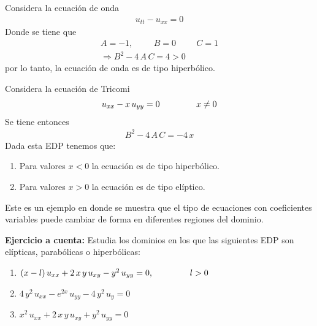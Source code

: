 \begin{ejemplo}
Considera la ecuación de onda
\begin{align*}
u_{tt} - u_{xx} = 0
\end{align*}
Donde se tiene que
\begin{align*}
A = -1, \hspace{1cm} B = 0 \hspace{1cm} C = 1 \\
\Rightarrow B^{2} - 4 \, A \, C = 4 > 0
\end{align*}
por lo tanto, la ecuación de onda es de tipo hiperbólico.
\end{ejemplo}
\begin{ejemplo}
Considera la ecuación de Tricomi
\begin{align*}
u_{xx} - x \, u_{yy} = 0 \hspace{1.5cm} x \neq 0
\end{align*}
Se tiene entonces
\begin{align*}
B^{2} - 4 \, A \, C = - 4 \, x
\end{align*}
Dada esta EDP tenemos que:
\begin{enumerate}
\item Para valores $x < 0$ la ecuación es de tipo hiperbólico.
\item Para valores $x > 0$ la ecuación es de tipo elíptico.
\end{enumerate}
Este es un ejemplo en donde se muestra que el tipo de ecuaciones con coeficientes variables puede cambiar de forma en diferentes regiones del dominio.
\end{ejemplo}
\textbf{Ejercicio a cuenta: } Estudia los dominios en los que las siguientes EDP son elípticas, parabólicas o hiperbólicas:
\begin{enumerate}[label=(\roman*)]
\item $(x - l) \, u_{x x} + 2 \, x \, y \, u_{x y} - y^{2} \, u_{y y } = 0, \hspace{1.5cm} l > 0$
\item $4 \, y^{2} \, u_{x x} - e^{2 x} \, u_{y y} - 4 \, y^{2} \, u_{y} = 0$
\item $x^{2} \, u_{x x} + 2 \, x \, y \, u_{x y} + y^{2} \, u_{y y} = 0$
\end{enumerate}
